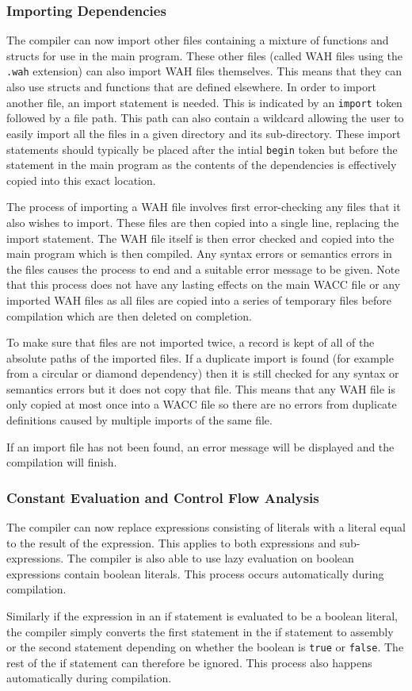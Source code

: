 \documentclass[]{article}
\begin{document}
\subsubsection{Importing Dependencies} { The compiler can now import other files containing a mixture of functions and structs for use in the main program. These other files (called WAH files using the {\tt .wah} extension) can also import WAH files themselves. This means that they can also use structs and functions that are defined elsewhere. In order to import another file, an import statement is needed. This is indicated by an {\tt import} token followed by a file path. This path can also contain a wildcard allowing the user to easily import all the files in a given directory and its sub-directory. These import statements should typically be placed after the intial {\tt begin} token but before the statement in the main program as the contents of the dependencies is effectively copied into this exact location.

The process of importing a WAH file involves first error-checking any files that it also wishes to import. These files are then copied into a single line, replacing the import statement. The WAH file itself is then error checked and copied into the main program which is then compiled. Any syntax errors or semantics errors in the files causes the process to end and a suitable error message to be given. Note that this process does not have any lasting effects on the main WACC file or any imported WAH files as all files are copied into a series of temporary files before compilation which are then deleted on completion.

To make sure that files are not imported twice, a record is kept of all of the absolute paths of the imported files. If a duplicate import is found (for example from a circular or diamond dependency) then it is still checked for any syntax or semantics errors but it does not copy that file. This means that any WAH file is only copied at most once into a WACC file so there are no errors from duplicate definitions caused by multiple imports of the same file.

If an import file has not been found, an error message will be displayed and the compilation will finish. }
\subsubsection{Constant Evaluation and Control Flow Analysis} { The compiler can now replace expressions consisting of literals with a literal equal to the result of the expression. This applies to both expressions and sub-expressions. The compiler is also able to use lazy evaluation on boolean expressions contain boolean literals. This process occurs automatically during compilation.

Similarly if the expression in an if statement is evaluated to be a boolean literal, the compiler simply converts the first statement in the if statement to assembly or the second statement depending on whether the boolean is {\tt true} or {\tt false}. The rest of the if statement can therefore be ignored. This process also happens automatically during compilation. }
\end{document}
